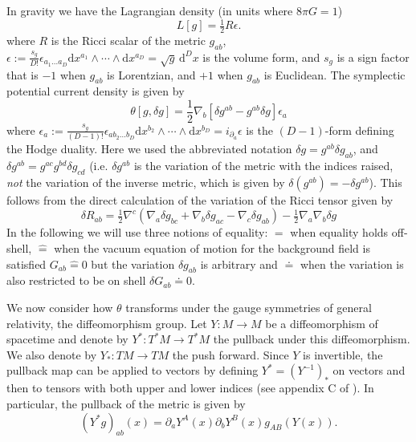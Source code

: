 \documentclass[a4paper,11pt]{article}
\newcommand{\be}{\begin{equation}}
\newcommand{\ee}{\end{equation}}
\def\rd{\mathrm{d}}
\def\pa{\partial}
\newcommand{\hateq}{\mathrel{\hat{=}}}
\begin{document}
In gravity we have the Lagrangian density (in units where $8 \pi G = 1$)
\be
L[g] = \tfrac12 R \epsilon.
\ee
where $R$ is the Ricci scalar of the metric $g_{ab}$, $\epsilon := \frac{s_{g}}{D!} \epsilon_{a_1 \ldots a_D} \rd x^{a_1} \wedge \cdots \wedge \rd x^{a_D}= \sqrt{g} \, \rd^Dx$ is the volume form, and $s_g$ is a sign factor that is $-1$ when $g_{ab}$ is Lorentzian, and $+1$ when $g_{ab}$ is Euclidean.
The symplectic potential current density is given by
\be \label{theta}
\theta[g, \delta g] = \frac12 \nabla_b \left[\delta g^{ab} -g^{ab}\delta g \right]\epsilon_{a}
\ee
where $\epsilon_a := \frac{s_{g}}{(D-1)!} \epsilon_{a b_2 \ldots b_D} \rd x^{b_2} \wedge \cdots \wedge \rd x^{b_D}=i_{\pa_a} \epsilon $ is the $(D-1)$-form defining the Hodge duality.
Here we used the abbreviated notation $\delta g = g^{ab} \delta g_{ab}$, and $\delta g^{a b} = g^{ac} g^{bd} \delta g_{cd}$ (i.e. $\delta g^{ab}$ is the variation of the metric with the indices raised, \emph{not} the variation of the inverse metric, which is given by $\delta (g^{ab})=-\delta g^{ab}$).
This follows from the direct calculation of the variation of the Ricci tensor given by
\begin{equation}
\delta R_{ab} = 
\tfrac12 \nabla^c  \left( \nabla_a \delta g_{bc}
+\nabla_b \delta g_{ac} - \nabla_c \delta g_{ab}
\right)- \tfrac12 
\nabla_a \nabla_b \delta g
\end{equation}
In the following we will use three notions of equality: $=$ when equality holds off-shell, $\hateq$ when the vacuum equation of motion for the background field is satisfied $G_{ab} \hateq 0$ but the variation $\delta g_{ab} $ is arbitrary and $\doteq$ when the variation is also restricted to be on shell $\delta G_{ab} \doteq 0$.

We now consider how $\theta$ transforms under the gauge symmetries of general relativity, the diffeomorphism group.
Let $Y: M \to M$ be a diffeomorphism of spacetime and denote by $Y^*: T^*M \to T^* M$ the pullback under this diffeomorphism. We also denote by $Y_*: T M \to T M$ the push forward.
Since $Y$ is invertible, the pullback map can be applied to vectors by defining $Y^* =(Y^{-1})_*$ on vectors and then to tensors with both upper and lower indices  (see appendix C of \cite{Wald1984}).
In particular, the pullback of the metric is given by
\begin{equation}
(Y^*g)_{ab}(x) = \partial_a Y^A(x) \partial_b Y^B(x) g_{AB}(Y(x)).
\end{equation}
\end{document}
